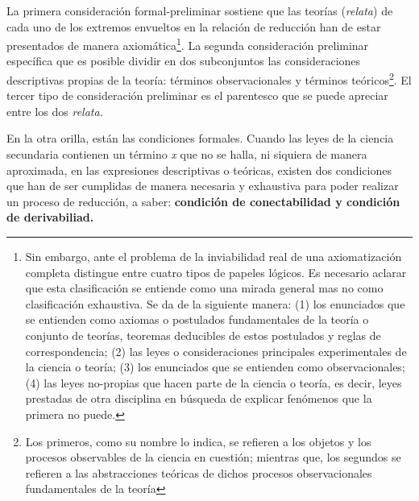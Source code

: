 \documentclass[]{book}
\begin{document}
La primera consideración formal-preliminar sostiene que las teorías
(\emph{relata}) de cada uno de los extremos envueltos en la relación de
reducción han de estar presentados de manera axiomática\footnote{Sin
  embargo, ante el problema de la inviabilidad real de una
  axiomatización completa distingue entre cuatro tipos de papeles
  lógicos. Es necesario aclarar que esta clasificación se entiende como
  una mirada general mas no como clasificación exhaustiva. Se da de la
  siguiente manera: (1) los enunciados que se entienden como axiomas o
  postulados fundamentales de la teoría o conjunto de teorías, teoremas
  deducibles de estos postulados y reglas de correspondencia; (2) las
  leyes o consideraciones principales experimentales de la ciencia o
  teoría; (3) los enunciados que se entienden como observacionales; (4)
  las leyes no-propias que hacen parte de la ciencia o teoría, es decir,
  leyes prestadas de otra disciplina en búsqueda de explicar fenómenos
  que la primera no puede.}. La segunda consideración preliminar
específica que es posible dividir en dos subconjuntos las
consideraciones descriptivas propias de la teoría: términos
observacionales y términos teóricos\footnote{Los primeros, como su
  nombre lo indica, se refieren a los objetos y los procesos observables
  de la ciencia en cuestión; mientras que, los segundos se refieren a
  las abstracciones teóricas de dichos procesos observacionales
  fundamentales de la teoría}. El tercer tipo de consideración
preliminar es el parentesco que se puede apreciar entre los dos
\emph{relata.}

En la otra orilla, están las condiciones formales. Cuando las leyes de
la ciencia secundaria contienen un término \emph{x} que no se halla, ni
siquiera de manera aproximada, en las expresiones descriptivas o
teóricas, existen dos condiciones que han de ser cumplidas de manera
necesaria y exhaustiva para poder realizar un proceso de reducción, a
saber: \textbf{condición de conectabilidad y condición de derivabiliad.
}
\end{document}
